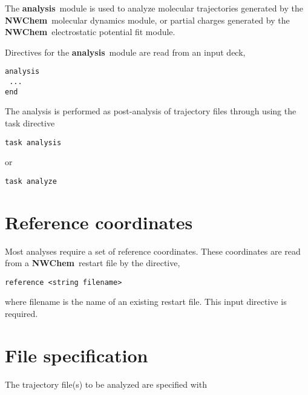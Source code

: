 \label{sec:analysis}
\def\bmu{\mbox{\boldmath $\mu$}}
\def\bE{\mbox{\bf E}}
\def\br{\mbox{\bf r}}
\def\tT{\tilde{T}}
\def\t{\tilde{1}}
\def\ip{i\prime}
\def\jp{j\prime}
\def\ipp{i\prime\prime}
\def\jpp{j\prime\prime}
\def\etal{{\sl et al.}}
\def\nwchem{{\bf NWChem}}
\def\nwargos{{\bf nwargos}}
\def\nwtop{{\bf nwtop}}
\def\nwrst{{\bf nwrst}}
\def\nwsgm{{\bf nwsgm}}
\def\esp{{\bf esp}}
\def\md{{\bf md}}
\def\prepare{{\bf prepare}}
\def\analysis{{\bf analysis}}
\def\argos{{\bf ARGOS}}
\def\amber{{\bf AMBER}}
\def\charmm{{\bf CHARMM}}
\def\discover{{\bf DISCOVER}}
\def\ecce{{\bf ecce}}

The \analysis\ module is used to analyze molecular trajectories generated
by the \nwchem\ molecular dynamics module, or partial charges generated
by the \nwchem\ electrostatic potential fit module.

Directives for the \analysis\ module are read from an input deck,

\begin{verbatim}
analysis
 ...
end
\end{verbatim}

The analysis is performed  as post-analysis of trajectory files through 
using the {\rm task} directive

\begin{verbatim}
task analysis
\end{verbatim}
or
\begin{verbatim}
task analyze
\end{verbatim}

\section{Reference coordinates}

Most analyses require a set of reference coordinates. These
coordinates are read from a \nwchem\ restart file by the directive,

\begin{verbatim}
reference <string filename>
\end{verbatim}

where {\rm filename} is the name of an existing restart file. 
This input directive is required.

\section{File specification}

The trajectory file(s) to be analyzed are specified with

